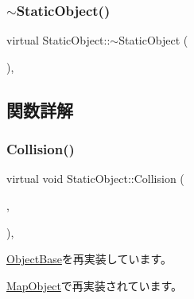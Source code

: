 \mbox{\label{class_static_object_ac27301fc3d8d22aff5664f592c375cd8}} 
\subsubsection{\texorpdfstring{$\sim$\+Static\+Object()}{~StaticObject()}}
{\footnotesize\ttfamily virtual Static\+Object\+::$\sim$\+Static\+Object (\begin{DoxyParamCaption}{ }\end{DoxyParamCaption})\hspace{0.3cm}{\ttfamily [inline]}, {\ttfamily [virtual]}}



\subsection{関数詳解}
\mbox{\label{class_static_object_abe05f711f0d62319e1a11419813c5d50}} 
\subsubsection{\texorpdfstring{Collision()}{Collision()}}
{\footnotesize\ttfamily virtual void Static\+Object\+::\+Collision (\begin{DoxyParamCaption}\item[{\mbox{\hyperlink{class_object_base}{Object\+Base}} $\ast$}]{,  }\item[{\mbox{\hyperlink{transform_8h_afb0c5e21d4133ff4f200992c0b534e1b}{V\+E\+C2}}}]{ }\end{DoxyParamCaption})\hspace{0.3cm}{\ttfamily [inline]}, {\ttfamily [virtual]}}



\mbox{\hyperlink{class_object_base_ad772d7a42f5e46c39481f5db22ee8193}{Object\+Base}}を再実装しています。



\mbox{\hyperlink{class_map_object_a61c2b7e046b76d98adbf23c9e6302918}{Map\+Object}}で再実装されています。

\mbox{\label{class_static_object_ab17d0cb5b2544054022356a7ee4000db}} 
